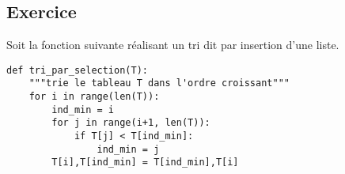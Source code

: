 \subsection*{Exercice}

Soit la fonction suivante réalisant un tri dit par insertion d'une liste. 
\begin{lstlisting}
def tri_par_selection(T):
    """trie le tableau T dans l'ordre croissant"""
    for i in range(len(T)):
        ind_min = i
        for j in range(i+1, len(T)):
            if T[j] < T[ind_min]:
                ind_min = j
        T[i],T[ind_min] = T[ind_min],T[i]
\end{lstlisting}

\ifprof
